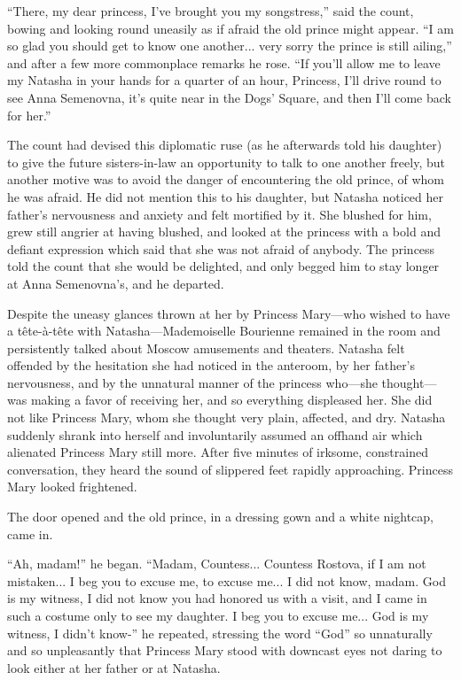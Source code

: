 ``There, my dear princess, I've brought you my songstress,'' said
the count, bowing and looking round uneasily as if afraid the old
prince might appear. ``I am so glad you should get to know one
another... very sorry the prince is still ailing,'' and after a
few more commonplace remarks he rose. ``If you'll allow me to
leave my Natasha in your hands for a quarter of an hour,
Princess, I'll drive round to see Anna Semenovna, it's quite near
in the Dogs' Square, and then I'll come back for her.''

The count had devised this diplomatic ruse (as he afterwards told
his daughter) to give the future sisters-in-law an opportunity to
talk to one another freely, but another motive was to avoid the
danger of encountering the old prince, of whom he was afraid. He
did not mention this to his daughter, but Natasha noticed her
father's nervousness and anxiety and felt mortified by it. She
blushed for him, grew still angrier at having blushed, and looked
at the princess with a bold and defiant expression which said
that she was not afraid of anybody. The princess told the count
that she would be delighted, and only begged him to stay longer
at Anna Semenovna's, and he departed.

Despite the uneasy glances thrown at her by Princess Mary---who
wished to have a tête-à-tête with Natasha---Mademoiselle
Bourienne remained in the room and persistently talked about
Moscow amusements and theaters.  Natasha felt offended by the
hesitation she had noticed in the anteroom, by her father's
nervousness, and by the unnatural manner of the princess
who---she thought---was making a favor of receiving her, and so
everything displeased her. She did not like Princess Mary, whom
she thought very plain, affected, and dry. Natasha suddenly
shrank into herself and involuntarily assumed an offhand air
which alienated Princess Mary still more. After five minutes of
irksome, constrained conversation, they heard the sound of
slippered feet rapidly approaching. Princess Mary looked
frightened.

The door opened and the old prince, in a dressing gown and a
white nightcap, came in.

``Ah, madam!'' he began. ``Madam, Countess... Countess Rostova,
if I am not mistaken... I beg you to excuse me, to excuse me... I
did not know, madam. God is my witness, I did not know you had
honored us with a visit, and I came in such a costume only to see
my daughter. I beg you to excuse me... God is my witness, I
didn't know-'' he repeated, stressing the word ``God'' so
unnaturally and so unpleasantly that Princess Mary stood with
downcast eyes not daring to look either at her father or at
Natasha.

